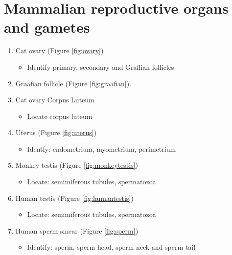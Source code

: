 \documentclass[]{book}
\providecommand{\tightlist}{%
  \setlength{\itemsep}{0pt}\setlength{\parskip}{0pt}}
\theoremstyle{definition}
\theoremstyle{definition}
\theoremstyle{definition}
\theoremstyle{remark}
\begin{document}
\section{Mammalian reproductive organs and
gametes}\label{mammalian-reproductive-organs-and-gametes}

\begin{enumerate}
\def\labelenumi{\arabic{enumi}.}
\tightlist
\item
  Cat ovary (Figure \ref{fig:ovary})
\begin{itemize}
  \item
  Identify primary, secondary and
  Graffian follicles
\end{itemize}
\item
  Graafian follicle (Figure \ref{fig:graafian}).
\item
  Cat ovary Corpus Luteum
  \begin{itemize}
    \item
  Locate corpus luteum
\end{itemize}
\item
  Uterus (Figure \ref{fig:uterus})

\begin{itemize}
  \item
  Identfy: endometrium, myometrium,
  perimetrium
\end{itemize}

\item
  Monkey testis (Figure \ref{fig:monkeytestis})

\begin{itemize}
  \item
  Locate: semimiferous
  tubules, spermatozoa
\end{itemize}

\item
  Human testis (Figure \ref{fig:humantestis})
  \begin{itemize}
    \item
    Locate: semimiferous
    tubules, spermatozoa
  \end{itemize}
\item
  Human sperm smear (Figure \ref{fig:sperm})

\begin{itemize}
  \item
  Identify: sperm, sperm
  head, sperm neck and sperm tail
\end{itemize}


\end{enumerate}
\end{document}
